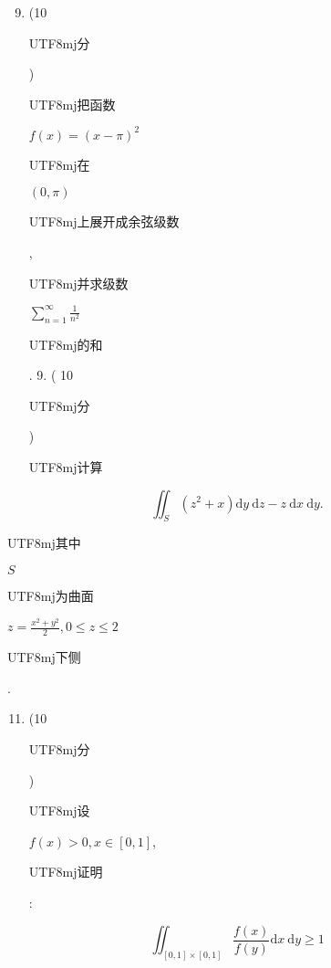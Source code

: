 \documentclass[10pt]{article}
\begin{document}
\begin{enumerate}
  \setcounter{enumi}{8}
  \item (10 \begin{CJK}{UTF8}{mj}分\end{CJK}) \begin{CJK}{UTF8}{mj}把函数\end{CJK} $f(x)=(x-\pi)^{2}$ \begin{CJK}{UTF8}{mj}在\end{CJK} $(0, \pi)$ \begin{CJK}{UTF8}{mj}上展开成余弦级数\end{CJK}, \begin{CJK}{UTF8}{mj}并求级数\end{CJK} $\sum_{n=1}^{\infty} \frac{1}{n^{2}}$ \begin{CJK}{UTF8}{mj}的和\end{CJK}. 9. ( 10 \begin{CJK}{UTF8}{mj}分\end{CJK}) \begin{CJK}{UTF8}{mj}计算\end{CJK}
\end{enumerate}
$$
\iint_{S}\left(z^{2}+x\right) \mathrm{d} y \mathrm{~d} z-z \mathrm{~d} x \mathrm{~d} y .
$$
\begin{CJK}{UTF8}{mj}其中\end{CJK} $S$ \begin{CJK}{UTF8}{mj}为曲面\end{CJK} $z=\frac{x^{2}+y^{2}}{2}, 0 \leq z \leq 2$ \begin{CJK}{UTF8}{mj}下侧\end{CJK}.

\begin{enumerate}
  \setcounter{enumi}{10}
  \item (10 \begin{CJK}{UTF8}{mj}分\end{CJK}) \begin{CJK}{UTF8}{mj}设\end{CJK} $f(x)>0, x \in[0,1]$, \begin{CJK}{UTF8}{mj}证明\end{CJK}:
\end{enumerate}
$$
\iint_{[0,1] \times[0,1]} \frac{f(x)}{f(y)} \mathrm{d} x \mathrm{~d} y \geq 1
$$
\end{document}
